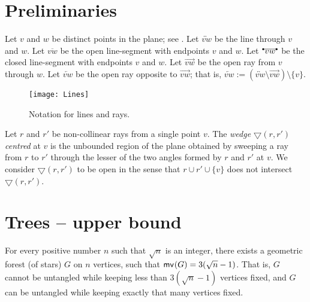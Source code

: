 \documentclass[lotsofwhite,charterfonts, letter]{patmorin}
\newcommand{\ray}[2]{\ensuremath{\overrightarrow{#1#2}}}
\newcommand{\oray}[2]{\ensuremath{\overleftarrow{#1#2}}}
\newcommand{\WEDGE}[2]{\ensuremath{\bigtriangledown(#1,#2)}}
\newcommand{\segc}[2]{\ensuremath{
\raisebox{1ex}{\tiny$\bullet$\hspace*{-0.1em}}
\overline{\hspace*{0.05em}#1#2\hspace*{0.05em}}
\raisebox{1ex}{\hspace*{-0.1em}\tiny$\bullet$}}}
\newcommand{\seg}[2]{\ensuremath{\overline{#1#2}}}
\newcommand{\lin}[2]{\ensuremath{\overleftrightarrow{#1#2}}}
\newcommand{\Figure}[4][htb]{
\begin{figure}[#1]
  \vspace*{1ex}
  \begin{center}#3\end{center}
	\vspace*{-2ex}
	\caption{\figlabel{#2}#4}
\end{figure}}
\newcommand{\x}{\ensuremath{\protect\textup{\textsf{x}}}}
\newcommand{\y}{\ensuremath{\protect\textup{\textsf{y}}}}
\newcommand{\mv}[2][]{\ensuremath{\textup{\textsf{mv}}_{#1}(#2)}}
\begin{document}




\section{Preliminaries}

Let $v$ and $w$ be distinct points in 
the plane; see . 
Let \lin{v}{w} be the line through $v$ and $w$. 
Let \seg{v}{w} be the open line-segment with endpoints $v$ and $w$. 
Let \segc{v}{w} be the closed line-segment with endpoints $v$ and $w$.
Let \ray{v}{w} be the open ray from $v$ through $w$. 
Let \oray{v}{w} be the open ray opposite to \ray{v}{w}; that is,  $\oray{v}{w}:=(\lin{v}{w}\setminus\ray{v}{w})\setminus\{v\}$.

\Figure{Lines}{\texttt{[image: Lines]}}{Notation for lines and rays.}



Let $r$ and $r'$ be non-collinear rays from a single point $v$. The \emph{wedge} \WEDGE{r}{r'} \emph{centred} at $v$ is the unbounded region of the plane obtained by sweeping a ray from $r$ to $r'$ through the lesser of the two angles formed by $r$ and $r'$ at $v$. We consider \WEDGE{r}{r'} to be open in the sense that $r\cup r'\cup\{v\}$ does not intersect \WEDGE{r}{r'}.


\section{Trees -- upper bound}


\begin{thm}
For every positive number $n$ such that $\sqrt{n}$ is an integer, there exists a geometric forest (of stars) $G$ on $n$ vertices, such that $\mv{G}=3(\sqrt{n}-1)$. That is, $G$ cannot be untangled while keeping less than $3(\sqrt{n}-1)$ vertices fixed, and $G$ can be untangled while keeping exactly that many  vertices fixed. 
\end{thm}
\end{document}
